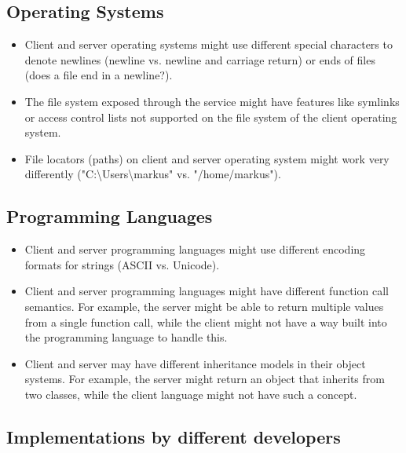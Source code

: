 \documentclass[a4paper]{article}
\begin{document}
\subsection{Operating Systems}

\begin{itemize}

    \item Client and server operating systems might use different special characters to denote newlines (newline vs. newline and carriage return) or ends of files (does a file end in a newline?).

    \item The file system exposed through the service might have features like symlinks or access control lists not supported on the file system of the client operating system. 

    \item File locators (paths) on client and server operating system might work very differently ("C:\textbackslash Users\textbackslash markus" vs. "/home/markus").

\end{itemize}

\subsection{Programming Languages}

\begin{itemize}

    \item Client and server programming languages might use different encoding formats for strings (ASCII vs. Unicode).

    \item Client and server programming languages might have different function call semantics. For example, the server might be able to return multiple values from a single function call, while the client might not have a way built into the programming language to handle this.

    \item Client and server may have different inheritance models in their object systems. For example, the server might return an object that inherits from two classes, while the client language might not have such a concept.

\end{itemize}

\subsection{Implementations by different developers}
\end{document}

